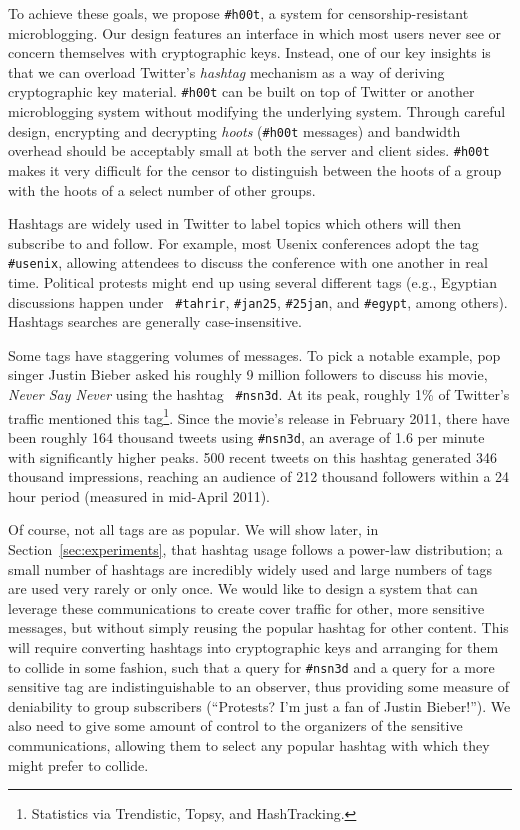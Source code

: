 \documentclass{sig-alternate-arxiv}
\newcommand{\hoot}{{\tt \#h00t}\xspace}
\newcommand{\msgs}{hoots\xspace}
\begin{document}
To achieve these goals, we propose \hoot, a system for
censorship-resistant microblogging. Our design features an interface in
which most users never see or concern themselves with cryptographic
keys. Instead, one of our key insights is that we can overload Twitter's
{\em hashtag} mechanism as a way of deriving cryptographic key
material. \hoot can be built on top of Twitter or another microblogging
system without modifying the underlying system. Through careful design,
encrypting and decrypting {\em \msgs} (\hoot messages) and bandwidth
overhead should be acceptably small at both the server and client sides.
\hoot makes it very difficult for the censor to distinguish between the
\msgs of a group with the \msgs of a select number of other groups.


Hashtags are widely used in Twitter to label topics which others will
then subscribe to and follow. For example, most Usenix conferences adopt
the tag {\tt \#usenix}, allowing attendees to discuss the conference
with one another in real time. Political protests might end up using
several different tags (e.g., Egyptian discussions happen under {\tt
  \#tahrir}, {\tt \#jan25}, {\tt \#25jan}, and {\tt \#egypt}, among
others). Hashtags searches are generally case-insensitive.

Some tags have staggering volumes of messages. To pick a notable
example, pop singer Justin Bieber asked his roughly 9 million followers
to discuss his movie, {\em Never Say Never} using the hashtag {\tt
  \#nsn3d}. At its peak, roughly 1\% of Twitter's traffic mentioned this
tag\footnote{Statistics via Trendistic, Topsy, and HashTracking.}. Since
the movie's release in February 2011, there have been roughly 164
thousand tweets using {\tt \#nsn3d}, an average of 1.6 per minute with
significantly higher peaks. 500 recent tweets on this hashtag generated
346 thousand impressions, reaching an audience of 212 thousand followers
within a 24 hour period (measured in mid-April 2011).

Of course, not all tags are as popular. We will show later, in
Section~\ref{sec:experiments}, that hashtag usage follows a power-law
distribution; a small number of hashtags are incredibly widely used and
large numbers of tags are used very rarely or only once. We would like
to design a system that can leverage these communications to create
cover traffic for other, more sensitive messages, but without simply
reusing the popular hashtag for other content. This will require
converting hashtags into cryptographic keys and arranging for them to
collide in some fashion, such that a query for {\tt \#nsn3d} and a query
for a more sensitive tag are indistinguishable to an observer, thus
providing some measure of deniability to group subscribers (``Protests?
I'm just a fan of Justin Bieber!''). We also need to give some amount of
control to the organizers of the sensitive communications, allowing them
to select any popular hashtag with which they might prefer to collide.
\end{document}
